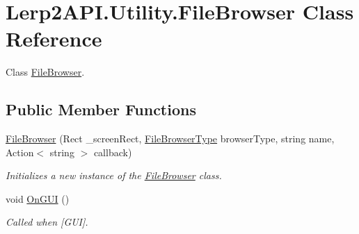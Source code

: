 \hypertarget{class_lerp2_a_p_i_1_1_utility_1_1_file_browser}{}\section{Lerp2\+A\+P\+I.\+Utility.\+File\+Browser Class Reference}
\label{class_lerp2_a_p_i_1_1_utility_1_1_file_browser}


Class \hyperlink{class_lerp2_a_p_i_1_1_utility_1_1_file_browser}{File\+Browser}.  


\subsection*{Public Member Functions}
\begin{DoxyCompactItemize}
\item 
\hyperlink{class_lerp2_a_p_i_1_1_utility_1_1_file_browser_a05a3b77b7e05d43111821ae8524c0260}{File\+Browser} (Rect \+\_\+screen\+Rect, \hyperlink{namespace_lerp2_a_p_i_1_1_utility_af5d628470963cc0f18c37055b4170bf1}{File\+Browser\+Type} browser\+Type, string name, Action$<$ string $>$ callback)
\begin{DoxyCompactList}\small\item\em Initializes a new instance of the \hyperlink{class_lerp2_a_p_i_1_1_utility_1_1_file_browser}{File\+Browser} class. \end{DoxyCompactList}\item 
void \hyperlink{class_lerp2_a_p_i_1_1_utility_1_1_file_browser_a3c08b2d6e693189b786787086cccf889}{On\+G\+UI} ()
\begin{DoxyCompactList}\small\item\em Called when \mbox{[}G\+UI\mbox{]}. \end{DoxyCompactList}\end{DoxyCompactItemize}
